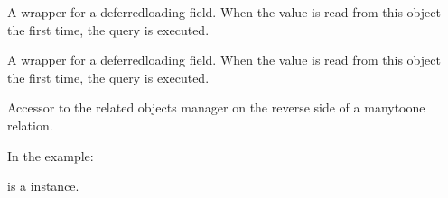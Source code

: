 \documentclass[letterpaper,10pt,french]{sphinxmanual}
\begin{document}
\begin{fulllineitems}
\begin{fulllineitems}
\end{fulllineitems}


\begin{fulllineitems}
\label{\detokenize{main/model:main.models.Matiere.heures}}
\pysigstartsignatures
{}
\pysigstopsignatures
\sphinxAtStartPar
A wrapper for a deferred\sphinxhyphen{}loading field. When the value is read from this
object the first time, the query is executed.

\end{fulllineitems}


\begin{fulllineitems}
\label{\detokenize{main/model:main.models.Matiere.id}}
\pysigstartsignatures
{}
\pysigstopsignatures
\sphinxAtStartPar
A wrapper for a deferred\sphinxhyphen{}loading field. When the value is read from this
object the first time, the query is executed.

\end{fulllineitems}


\begin{fulllineitems}
\label{\detokenize{main/model:main.models.Matiere.information_set}}
\pysigstartsignatures
{}
\pysigstopsignatures
\sphinxAtStartPar
Accessor to the related objects manager on the reverse side of a
many\sphinxhyphen{}to\sphinxhyphen{}one relation.

\sphinxAtStartPar
In the example:

\begin{sphinxVerbatim}[commandchars=\\\{\}]
 
       
\end{sphinxVerbatim}

\sphinxAtStartPar
{} is a  instance.


\end{fulllineitems}
\end{fulllineitems}
\end{document}
